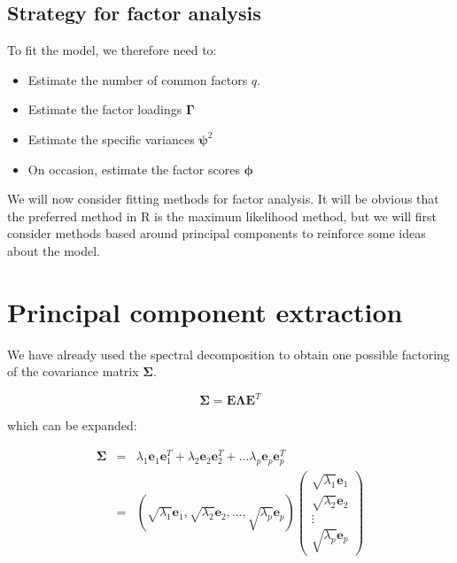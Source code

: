\subsection{Strategy for factor analysis}

 To fit the model, we therefore need to:

\begin{itemize}
\item Estimate the number of common factors $q$.   
\item Estimate the factor loadings $\boldsymbol{\Gamma}$
\item Estimate the specific variances $\boldsymbol{\psi}^{2}$
\item On occasion, estimate the factor scores $\boldsymbol{\phi}$
\end{itemize}


We will now consider fitting methods for factor analysis.   It will be obvious that the preferred method in R is the maximum likelihood method, but we will first consider methods based around principal components to reinforce some ideas about the model.

\section{Principal component extraction}

We have already used the spectral decomposition to obtain one possible factoring of the covariance matrix $\boldsymbol{\Sigma}$.

\begin{displaymath}
\boldsymbol{\Sigma} = \boldsymbol{E} \boldsymbol{\Lambda}\boldsymbol{E}^{T}
\end{displaymath}

which can be expanded:

\begin{eqnarray*}
\boldsymbol{\Sigma} &=& \lambda_{1} \boldsymbol{e}_{1} \boldsymbol{e}_{1}^{T} +  \lambda_{2} \boldsymbol{e}_{2} \boldsymbol{e}_{2}^{T} + \ldots  \lambda_{p} \boldsymbol{e}_{p} \boldsymbol{e}_{p}^{T} \\
 &=& \left( \sqrt{\lambda_{1}} \boldsymbol{e}_{1}, \sqrt{\lambda_{2}} \boldsymbol{e}_{2}, \ldots, \sqrt{\lambda_{p}} \boldsymbol{e}_{p} \right) \left( \begin{array}{c} \sqrt{\lambda_{1}} \boldsymbol{e}_{1} \\  \sqrt{\lambda_{2}} \boldsymbol{e}_{2} \\ \vdots \\  \sqrt{\lambda_{p}} \boldsymbol{e}_{p} \end{array} \right)
\end{eqnarray*}

